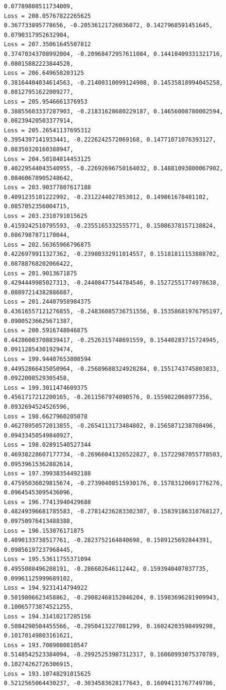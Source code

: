 \documentclass[11pt]{article}
\begin{document}
\begin{Verbatim}[commandchars=\\\{\}]
0.07789808511734009,
Loss = 208.05767822265625
0.367733895778656, -0.20536121726036072, 0.1427968591451645, 0.0790317952632904,
Loss = 207.35061645507812
0.37470343708992004, -0.20968472957611084, 0.14410409331321716,
0.08015882223844528,
Loss = 206.649658203125
0.38164404034614563, -0.21400310099124908, 0.14535818994045258,
0.08127951622009277,
Loss = 205.9546661376953
0.38855603337287903, -0.21831628680229187, 0.14656008780002594,
0.08239420503377914,
Loss = 205.26541137695312
0.3954397141933441, -0.2226242572069168, 0.14771071076393127,
0.08350320160388947,
Loss = 204.58184814453125
0.40229544043540955, -0.22692696750164032, 0.14881093800067902,
0.08460678905248642,
Loss = 203.90377807617188
0.4091235101222992, -0.2312244027853012, 0.149861678481102, 0.0857052356004715,
Loss = 203.2310791015625
0.4159242510795593, -0.2355165332555771, 0.15086378157138824,
0.0867987871170044,
Loss = 202.56365966796875
0.4226979911327362, -0.23980332911014557, 0.15181811153888702,
0.08788768202066422,
Loss = 201.9013671875
0.4294449985027313, -0.24408477544784546, 0.15272551774978638,
0.08897214382886887,
Loss = 201.24407958984375
0.43616557121276855, -0.24836085736751556, 0.15358681976795197,
0.09005236625671387,
Loss = 200.5916748046875
0.44286003708839417, -0.2526315748691559, 0.15440283715724945,
0.09112854301929474,
Loss = 199.94407653808594
0.44952866435050964, -0.25689688324928284, 0.1551743745803833,
0.0922008529305458,
Loss = 199.3011474609375
0.4561717212200165, -0.2611567974090576, 0.1559022068977356, 0.0932694524526596,
Loss = 198.6627960205078
0.46278950572013855, -0.2654113173484802, 0.1565871238708496,
0.09433450549840927,
Loss = 198.02891540527344
0.46938228607177734, -0.26966041326522827, 0.15722987055778503,
0.09539615362882614,
Loss = 197.39938354492188
0.47595036029815674, -0.27390408515930176, 0.15783120691776276,
0.09645453095436096,
Loss = 196.77413940429688
0.48249396681785583, -0.27814236283302307, 0.15839186310768127,
0.09750976413488388,
Loss = 196.153076171875
0.4890133738517761, -0.2823752164840698, 0.1589125692844391,
0.09856197237968445,
Loss = 195.53611755371094
0.4955088496208191, -0.286602646112442, 0.1593940407037735, 0.09961125999689102,
Loss = 194.9231414794922
0.5019806623458862, -0.29082468152046204, 0.15983696281909943,
0.10065773874521255,
Loss = 194.31410217285156
0.5084290504455566, -0.2950413227081299, 0.16024203598499298,
0.10170149803161621,
Loss = 193.7089080810547
0.5148542523384094, -0.29925253987312317, 0.16060993075370789,
0.10274262726306915,
Loss = 193.10748291015625
0.5212565064430237, -0.3034583628177643, 0.16094131767749786,

\end{Verbatim}
\end{document}
